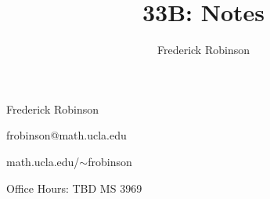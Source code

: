 \documentclass[14pt]{article}
\title{33B: Notes}
\author{Frederick Robinson}
\begin{document}
\maketitle

\pagebreak

Frederick Robinson

frobinson@math.ucla.edu

math.ucla.edu/$\sim$frobinson

Office Hours: TBD
MS 3969
\end{document}
